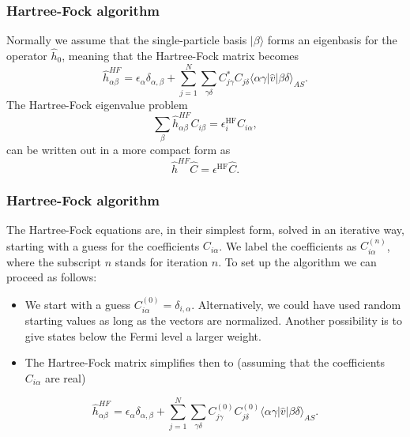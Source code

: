 \documentclass{beamer}
\begin{document}
\begin{frame}
\frametitle{Hartree-Fock algorithm}

\begin{block}{}
Normally we assume that the single-particle basis $|\beta\rangle$ forms an eigenbasis for the operator
$\hat{h}_0$, meaning that the Hartree-Fock matrix becomes  
\[
\hat{h}_{\alpha\beta}^{HF}=\epsilon_{\alpha}\delta_{\alpha,\beta}+
\sum_{j=1}^N\sum_{\gamma\delta} C^*_{j\gamma}C_{j\delta}\langle \alpha\gamma|\hat{v}|\beta\delta\rangle_{AS}.
\]
The Hartree-Fock eigenvalue problem
\[
\sum_{\beta}\hat{h}_{\alpha\beta}^{HF}C_{i\beta}=\epsilon_i^{\mathrm{HF}}C_{i\alpha},
\]
can be written out in a more compact form as
\[
\hat{h}^{HF}\hat{C}=\epsilon^{\mathrm{HF}}\hat{C}. 
\]
\end{block}
\end{frame}

\begin{frame}
\frametitle{Hartree-Fock algorithm}

\begin{block}{}
The Hartree-Fock equations are, in their simplest form, solved in an iterative way, starting with a guess for the
coefficients $C_{i\alpha}$. We label the coefficients as $C_{i\alpha}^{(n)}$, where the subscript $n$ stands for iteration $n$.
To set up the algorithm we can proceed as follows:

\begin{itemize}
 \item We start with a guess $C_{i\alpha}^{(0)}=\delta_{i,\alpha}$. Alternatively, we could have used random starting values as long as the vectors are normalized. Another possibility is to give states below the Fermi level a larger weight.

 \item The Hartree-Fock matrix simplifies then to (assuming that the coefficients $C_{i\alpha} $  are real)
\end{itemize}

\noindent
\[
\hat{h}_{\alpha\beta}^{HF}=\epsilon_{\alpha}\delta_{\alpha,\beta}+
\sum_{j = 1}^N\sum_{\gamma\delta} C_{j\gamma}^{(0)}C_{j\delta}^{(0)}\langle \alpha\gamma|\hat{v}|\beta\delta\rangle_{AS}.
\]
\end{block}
\end{frame}
\end{document}
